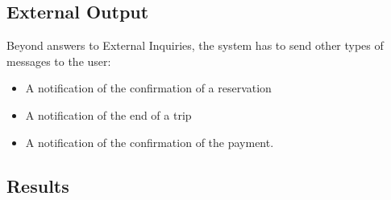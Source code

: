 \subsection{External Output} %
Beyond answers to External Inquiries, the system has to send other types of messages to the user:
\begin{itemize}
\item A notification of the confirmation of a reservation
\item A notification of the end of a trip
\item A notification of the confirmation of the payment.
\end{itemize}


\subsection{Results} %


